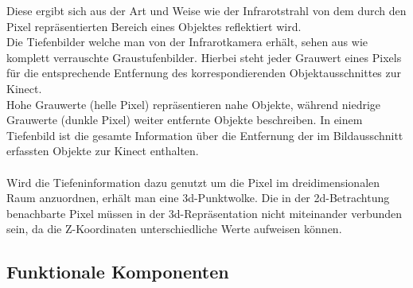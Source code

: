 Diese ergibt sich aus der Art und Weise wie der Infrarotstrahl von dem durch den Pixel repräsentierten Bereich eines Objektes reflektiert wird.\\

Die Tiefenbilder welche man von der Infrarotkamera erhält, sehen aus wie komplett verrauschte Graustufenbilder. Hierbei steht jeder Grauwert eines Pixels für die entsprechende Entfernung des korrespondierenden Objektausschnittes zur Kinect.\\
Hohe Grauwerte (helle Pixel) repräsentieren nahe Objekte, während niedrige Grauwerte (dunkle Pixel) weiter entfernte Objekte beschreiben. In einem Tiefenbild ist die gesamte Information über die Entfernung der im Bildausschnitt erfassten Objekte zur Kinect enthalten.\\\\
Wird die Tiefeninformation dazu genutzt um die Pixel im dreidimensionalen Raum anzuordnen, erhält man eine 3d-Punktwolke. Die in der 2d-Betrachtung benachbarte Pixel müssen in der 3d-Repräsentation nicht miteinander verbunden sein, da die Z-Koordinaten unterschiedliche Werte aufweisen können. 
\subsection{Funktionale Komponenten}
